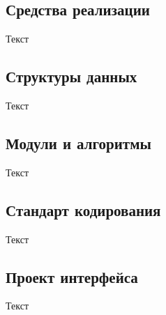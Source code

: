 \documentclass[../document.tex]{subfiles}
\begin{document}
\subsection{Средства реализации}
\par Текст
\subsection{Структуры данных}
\par Текст
\subsection{Модули и алгоритмы}
\par Текст
\subsection{Стандарт кодирования}
\par Текст
\subsection{Проект интерфейса}
\par Текст
\end{document}
